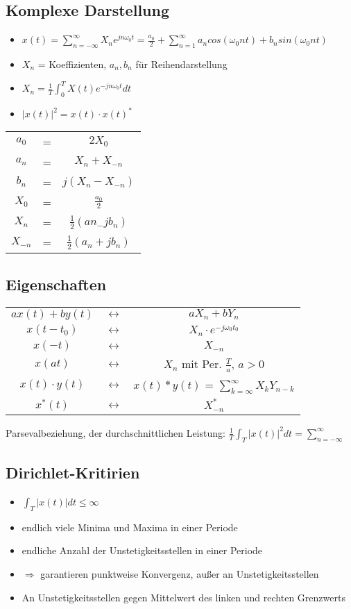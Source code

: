\documentclass{article}
\begin{document}
\subsection{Komplexe Darstellung}
\begin{itemize}
\item $x(t) = \sum_{n = - \infty}^\infty X_ne^{jn\omega_0t}  = \frac{a_0}{2} + \sum_{n=1}^\infty a_n cos(\omega_0nt)+b_nsin(\omega_0nt) $
\item $X_n$ = Koeffizienten, $a_n,b_n$ für Reihendarstellung
\item $X_n = \frac{1}{T} \int_0^T X(t) e^{-jn\omega_0t}dt$
\item $|x(t)|^2 = x(t)\cdot x(t)^*$
\end{itemize}
\begin{tabular}{c  c c}
$a_0$ &=& $2X_0$ \\
 $a_n$&= & $X_n +X_{-n}$ \\
 $b_n$&= & $j(X_n-X_{-n})$ \\
 $X_0$&= & $\frac{a_0}{2}$ \\
 $X_n$ &=& $\frac{1}{2}(an_-jb_n)$ \\
 $X_{-n}$ &=& $\frac{1}{2}(a_n+jb_n)$ \\
 \end{tabular}


\subsection{Eigenschaften}
\begin{tabular}{c c c}
$ax(t) + by(t)$ &$\leftrightarrow$& $aX_n+bY_n$ \\
$x(t-t_0)$ &$\leftrightarrow$& $X_n\cdot e^{-j\omega_0t_0}$ \\
$x(-t)$ &$\leftrightarrow$& $X_{-n}$ \\
$x(at)$ &$\leftrightarrow$& $X_n$ mit Per. $\frac{T}{a}$, $a > 0$ \\
$x(t)\cdot y(t)$ &$\leftrightarrow$& $x(t)*y(t)$  = $\sum_{k=\infty}^\infty X_kY_{n-k}$\\
$x^*(t)$ & $\leftrightarrow$ & $X^*_{-n}$\\
\end{tabular} \newline
Parsevalbeziehung, der durchschnittlichen Leistung: $\frac{1}{T} \int_T |x(t)|^2 dt = \sum_{n=-\infty}^\infty$

\subsection{Dirichlet-Kritirien}
\begin{itemize}
\item $\int_T |x(t)|dt \leq \infty$
\item endlich viele Minima und Maxima in einer Periode
\item endliche Anzahl der Unstetigkeitsstellen in einer Periode
\item $\Rightarrow$ garantieren punktweise Konvergenz, außer an Unstetigkeitsstellen
\item An Unstetigkeitsstellen gegen Mittelwert des linken und rechten Grenzwerts
\end{itemize}
\end{document}
